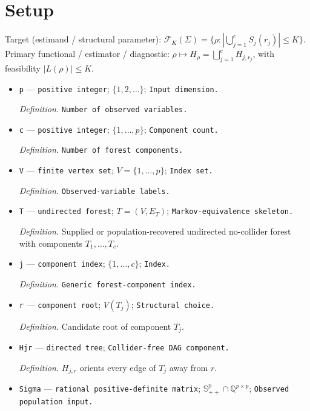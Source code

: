 \documentclass{article}
\begin{document}
\section{Setup}

Target (estimand / structural parameter): \(\mathcal F_K(\Sigma)=\{\rho:|\bigcup_{j=1}^{c}S_j(r_j)|\le K\}\).
Primary functional / estimator / diagnostic: \(\rho\mapsto H_\rho=\bigsqcup_{j=1}^{c}H_{j,r_j}\), with feasibility \(|L(\rho)|\le K\).
\begin{itemize}
  \item \texttt{p} --- \texttt{positive integer}; \(\{1,2,\ldots\}\); \texttt{Input dimension.}
  \par\smallskip\noindent\emph{Definition.} \texttt{Number of observed variables.}
  \item \texttt{c} --- \texttt{positive integer}; \(\{1,\ldots,p\}\); \texttt{Component count.}
  \par\smallskip\noindent\emph{Definition.} \texttt{Number of forest components.}
  \item \texttt{V} --- \texttt{finite vertex set}; \(V=\{1,\ldots,p\}\); \texttt{Index set.}
  \par\smallskip\noindent\emph{Definition.} \texttt{Observed-\allowbreak{}variable labels.}
  \item \texttt{T} --- \texttt{undirected forest}; \(T=(V,E_T)\); \texttt{Markov-\allowbreak{}equivalence skeleton.}
  \par\smallskip\noindent\emph{Definition.} Supplied or population-recovered undirected no-collider forest with components \(T_1,\ldots,T_c\).
  \item \texttt{j} --- \texttt{component index}; \(\{1,\ldots,c\}\); \texttt{Index.}
  \par\smallskip\noindent\emph{Definition.} \texttt{Generic forest-\allowbreak{}component index.}
  \item \texttt{r} --- \texttt{component root}; \(V(T_j)\); \texttt{Structural choice.}
  \par\smallskip\noindent\emph{Definition.} Candidate root of component \(T_j\).
  \item \texttt{Hjr} --- \texttt{directed tree}; \texttt{Collider-\allowbreak{}free DAG component.}
  \par\smallskip\noindent\emph{Definition.} \(H_{j,r}\) orients every edge of \(T_j\) away from \(r\).
  \item \texttt{Sigma} --- \texttt{rational positive-\allowbreak{}definite matrix}; \(\mathbb S_{++}^{p}\cap\mathbb Q^{p\times p}\); \texttt{Observed population input.}

\end{itemize}
\end{document}
